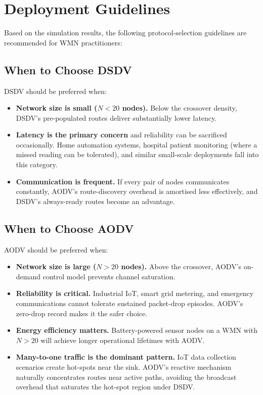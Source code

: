 \section{Deployment Guidelines}

Based on the simulation results, the following protocol-selection guidelines are
recommended for WMN practitioners:

\subsection{When to Choose DSDV}

DSDV should be preferred when:

\begin{itemize}
  \item \textbf{Network size is small ($N < 20$ nodes).} Below the crossover density,
    DSDV's pre-populated routes deliver substantially lower latency.
  \item \textbf{Latency is the primary concern} and reliability can be sacrificed
    occasionally. Home automation systems, hospital patient monitoring (where a missed
    reading can be tolerated), and similar small-scale deployments fall into this category.
  \item \textbf{Communication is frequent.} If every pair of nodes communicates
    constantly, AODV's route-discovery overhead is amortised less effectively, and
    DSDV's always-ready routes become an advantage.
\end{itemize}

\subsection{When to Choose AODV}

AODV should be preferred when:

\begin{itemize}
  \item \textbf{Network size is large ($N > 20$ nodes).} Above the crossover, AODV's
    on-demand control model prevents channel saturation.
  \item \textbf{Reliability is critical.} Industrial IoT, smart grid metering, and
    emergency communications cannot tolerate sustained packet-drop episodes. AODV's
    zero-drop record makes it the safer choice.
  \item \textbf{Energy efficiency matters.} Battery-powered sensor nodes on a WMN with
    $N > 20$ will achieve longer operational lifetimes with AODV.
  \item \textbf{Many-to-one traffic is the dominant pattern.} IoT data collection
    scenarios create hot-spots near the sink. AODV's reactive mechanism naturally
    concentrates routes near active paths, avoiding the broadcast overhead that saturates
    the hot-spot region under DSDV.
\end{itemize}

